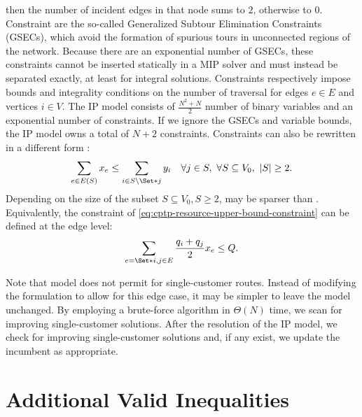 then the number of incident edges in that node sums to $2$, otherwise to $0$.
Constraint 
are the so-called Generalized Subtour Elimination Constraints (GSECs),
which avoid the formation of spurious tours in unconnected regions of the network.
Because there are an exponential number of GSECs,
these constraints cannot be inserted statically in a MIP solver
and must instead be separated exactly, at least for integral solutions.
Constraints  respectively
impose bounds and integrality conditions
on the number of traversal for edges $e \in E$ and vertices $i \in V$.
The IP model consists of $\frac{N^2 + N}{2}$ number of binary variables and an exponential number of constraints.
If we ignore the GSECs and variable bounds, the IP model owns a total of $N + 2$ constraints.
Constraints 
can also be rewritten in a different form \parencite{wolsey2020integer}:
\begin{equation}
	\label{eq:cptp-gsec-constraints-v2}
	\sum\limits_{e \in E(S)} x_e \le \sum\limits_{i \in S \setminus \Set*{j}} y_i \quad \forall j \in S,\ \forall S \subseteq V_0,\ |S| \ge 2.
\end{equation}
Depending on the size of the subset $S \subseteq V_0, S \ge 2$,
 may be sparser than .
Equivalently, the constraint of \cref{eq:cptp-resource-upper-bound-constraint}
can be defined at the edge level:
\begin{equation}
	\label{eq:cptp-resource-upper-bound-constraint-edge-level}
	\sum_{e = \Set*{i, j} \in E} \frac{q_i + q_j}{2} x_e \le Q.
\end{equation}

Note that model
does not permit for single-customer routes.
Instead of modifying the formulation to allow for this edge case,
it may be simpler to leave the model unchanged.
By employing a brute-force algorithm in $\Theta(N)$ time,
we scan for improving single-customer solutions.
After the resolution of the IP model,
we check for improving single-customer solutions and,
if any exist,
we update the incumbent as appropriate.

\section{Additional Valid Inequalities}
\label{sec:cptp-additional-valid-inequalities}

